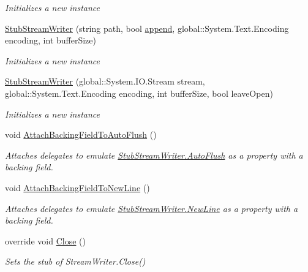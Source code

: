 \begin{DoxyCompactItemize}
\begin{DoxyCompactList}\small\item\em Initializes a new instance\end{DoxyCompactList}\item 
\hyperlink{class_system_1_1_i_o_1_1_fakes_1_1_stub_stream_writer_a6bce6bd1a87b22f71375f02b62f579bd}{Stub\-Stream\-Writer} (string path, bool \hyperlink{jquery-1_810_82-vsdoc_8js_a6b9ad5e0cf5c7480e9a327c771349a90}{append}, global\-::\-System.\-Text.\-Encoding encoding, int buffer\-Size)
\begin{DoxyCompactList}\small\item\em Initializes a new instance\end{DoxyCompactList}\item 
\hyperlink{class_system_1_1_i_o_1_1_fakes_1_1_stub_stream_writer_a605eb0e9716115b9fa49107a6d9da1c3}{Stub\-Stream\-Writer} (global\-::\-System.\-I\-O.\-Stream stream, global\-::\-System.\-Text.\-Encoding encoding, int buffer\-Size, bool leave\-Open)
\begin{DoxyCompactList}\small\item\em Initializes a new instance\end{DoxyCompactList}\item 
void \hyperlink{class_system_1_1_i_o_1_1_fakes_1_1_stub_stream_writer_a285166a7dbb74a79bcfeffc320cce74c}{Attach\-Backing\-Field\-To\-Auto\-Flush} ()
\begin{DoxyCompactList}\small\item\em Attaches delegates to emulate \hyperlink{class_system_1_1_i_o_1_1_fakes_1_1_stub_stream_writer_aa41a13ea97c2fb374fc1fd820a104561}{Stub\-Stream\-Writer.\-Auto\-Flush} as a property with a backing field.\end{DoxyCompactList}\item 
void \hyperlink{class_system_1_1_i_o_1_1_fakes_1_1_stub_stream_writer_a8d8d5d740f8539973da020037c9e5d00}{Attach\-Backing\-Field\-To\-New\-Line} ()
\begin{DoxyCompactList}\small\item\em Attaches delegates to emulate \hyperlink{class_system_1_1_i_o_1_1_fakes_1_1_stub_stream_writer_af8fbedb65b4d78881a6bfc6a8a29efb3}{Stub\-Stream\-Writer.\-New\-Line} as a property with a backing field.\end{DoxyCompactList}\item 
override void \hyperlink{class_system_1_1_i_o_1_1_fakes_1_1_stub_stream_writer_ad23fa818c2178677d4eb46f2c367e66c}{Close} ()
\begin{DoxyCompactList}\small\item\em Sets the stub of Stream\-Writer.\-Close()\end{DoxyCompactList}\item 

\end{DoxyCompactItemize}
